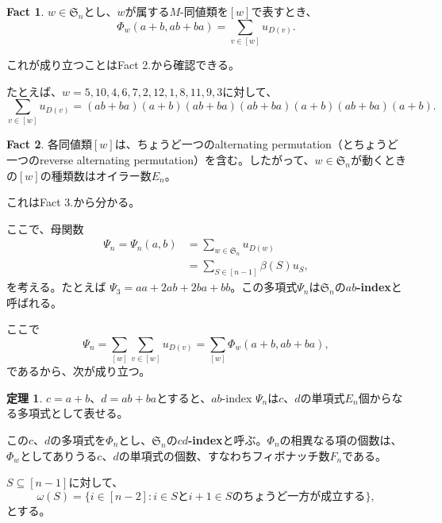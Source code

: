 \documentclass[xelatex,ja=standard,a4paper,14pt,everyparhook=compat]{bxjsarticle}
\newcommand{\fS}{\mathfrak{S}}
\theoremstyle{definition}
\newtheorem{theorem}{定理}[subsection]
\newtheorem{fact}{Fact}
\begin{document}
\begin{fact}
    $w \in \fS_n$とし、$w$が属する$M$-同値類を$[w]$で表すとき、 \begin{equation*}
        \Phi_w(a+b, ab+ba) = \sum_{v \in [w]} u_{D(v)}.
    \end{equation*}
\end{fact}
これが成り立つことはFact 2.から確認できる。

たとえば、$w=5,10,4,6,7,2,12,1,8,11,9,3$に対して、 \begin{equation*}
    \sum_{v \in [w]} u_{D(v)} = (ab+ba)(a+b)(ab+ba)(ab+ba)(a+b)(ab+ba)(a+b).
\end{equation*}

\begin{fact}
    各同値類$[w]$は、ちょうど一つのalternating permutation（とちょうど一つのreverse alternating permutation）を含む。したがって、$w \in \fS_n$が動くときの$[w]$の種類数はオイラー数$E_n$。
\end{fact}
これはFact 3.から分かる。

ここで、母関数 \begin{align*}
    \Psi_n = \Psi_n(a, b) &= \sum_{w \in \fS_n} u_{D(w)} \\
    &= \sum_{S \in [n-1]} \beta(S) u_S,
\end{align*}
を考える。たとえば $\Psi_3 = aa + 2ab + 2ba + bb$。この多項式$\Psi_n$は$\fS_n$の\textbf{$ab$-index}と呼ばれる。

ここで \begin{equation*}
    \Psi_n = \sum_{[w]} \sum_{v \in [w]} u_{D(v)} = \sum_{[w]} \Phi_w(a+b, ab+ba),
\end{equation*}
であるから、次が成り立つ。

\begin{theorem}
    $c=a+b$、$d=ab+ba$とすると、$ab$-index $\Psi_n$は$c$、$d$の単項式$E_n$個からなる多項式として表せる。
\end{theorem}

この$c$、$d$の多項式を$\Phi_n$とし、$\fS_n$の\textbf{$cd$-index}と呼ぶ。$\Phi_n$の相異なる項の個数は、$\Phi_w$としてありうる$c$、$d$の単項式の個数、すなわちフィボナッチ数$F_n$である。

$S \subseteq [n-1]$に対して、 \begin{equation*}
    \omega(S) = \{i \in [n-2] : \text{$i \in S$と$i+1 \in S$のちょうど一方が成立する}\},
\end{equation*}
とする。
\end{document}
